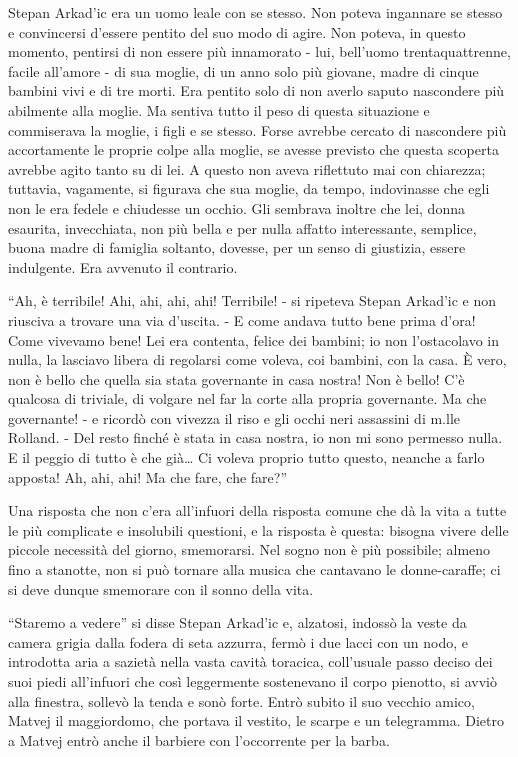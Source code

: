 Stepan Arkad'ic era un uomo leale con se stesso. Non poteva ingannare se stesso e convincersi d'essere pentito del suo modo di agire. Non poteva, in questo momento, pentirsi di non essere più innamorato - lui, bell'uomo trentaquattrenne, facile all'amore - di sua moglie, di un anno solo più giovane, madre di cinque bambini vivi e di tre morti. Era pentito solo di non averlo saputo nascondere più abilmente alla moglie. Ma sentiva tutto il peso di questa situazione e commiserava la moglie, i figli e se stesso. Forse avrebbe cercato di nascondere più accortamente le proprie colpe alla moglie, se avesse previsto che questa scoperta avrebbe agito tanto su di lei. A questo non aveva riflettuto mai con chiarezza; tuttavia, vagamente, si figurava che sua moglie, da tempo, indovinasse che egli non le era fedele e chiudesse un occhio. Gli sembrava inoltre che lei, donna esaurita, invecchiata, non più bella e per nulla affatto interessante, semplice, buona madre di famiglia soltanto, dovesse, per un senso di giustizia, essere indulgente. Era avvenuto il contrario. 

``Ah, è terribile! Ahi, ahi, ahi, ahi! Terribile! - si ripeteva Stepan Arkad'ic e non riusciva a trovare una via d'uscita. - E come andava tutto bene prima d'ora! Come vivevamo bene! Lei era contenta, felice dei bambini; io non l'ostacolavo in nulla, la lasciavo libera di regolarsi come voleva, coi bambini, con la casa. È vero, non è bello che quella sia stata governante in casa nostra! Non è bello! C'è qualcosa di triviale, di volgare nel far la corte alla propria governante. Ma che governante! - e ricordò con vivezza il riso e gli occhi neri assassini di m.lle Rolland. - Del resto finché è stata in casa nostra, io non mi sono permesso nulla. E il peggio di tutto è che già\ldots{} Ci voleva proprio tutto questo, neanche a farlo apposta! Ah, ahi, ahi! Ma che fare, che fare?'' 

Una risposta che non c'era all'infuori della risposta comune che dà la vita a tutte le più complicate e insolubili questioni, e la risposta è questa: bisogna vivere delle piccole necessità del giorno, smemorarsi. Nel sogno non è più possibile; almeno fino a stanotte, non si può tornare alla musica che cantavano le donne-caraffe; ci si deve dunque smemorare con il sonno della vita. 

``Staremo a vedere'' si disse Stepan Arkad'ic e, alzatosi, indossò la veste da camera grigia dalla fodera di seta azzurra, fermò i due lacci con un nodo, e introdotta aria a sazietà nella vasta cavità toracica, coll'usuale passo deciso dei suoi piedi all'infuori che così leggermente sostenevano il corpo pienotto, si avviò alla finestra, sollevò la tenda e sonò forte. Entrò subito il suo vecchio amico, Matvej il maggiordomo, che portava il vestito, le scarpe e un telegramma. Dietro a Matvej entrò anche il barbiere con l'occorrente per la barba. 

